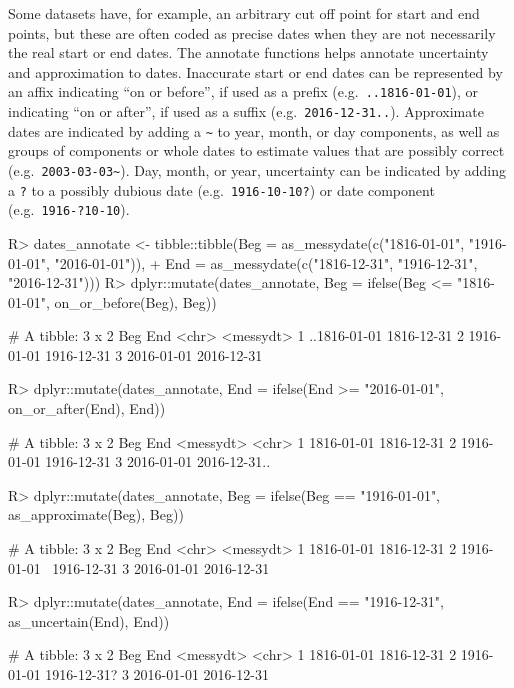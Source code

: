 \documentclass[
]{jss}
\begin{document}
Some datasets have, for example, an arbitrary cut off point for start
and end points, but these are often coded as precise dates when they are
not necessarily the real start or end dates. The annotate functions
helps annotate uncertainty and approximation to dates. Inaccurate start
or end dates can be represented by an affix indicating ``on or before'',
if used as a prefix (e.g.~\texttt{..1816-01-01}), or indicating ``on or
after'', if used as a suffix (e.g.~\texttt{2016-12-31..}). Approximate
dates are indicated by adding a \texttt{\textasciitilde{}} to year,
month, or day components, as well as groups of components or whole dates
to estimate values that are possibly correct
(e.g.~\texttt{2003-03-03\textasciitilde{}}). Day, month, or year,
uncertainty can be indicated by adding a \texttt{?} to a possibly
dubious date (e.g.~\texttt{1916-10-10?}) or date component
(e.g.~\texttt{1916-?10-10}).

\begin{CodeChunk}
\begin{CodeInput}
R> dates_annotate <- tibble::tibble(Beg = as_messydate(c("1816-01-01", "1916-01-01", "2016-01-01")),
+                                  End = as_messydate(c("1816-12-31", "1916-12-31", "2016-12-31")))
R> dplyr::mutate(dates_annotate, Beg = ifelse(Beg <= "1816-01-01", on_or_before(Beg), Beg))
\end{CodeInput}
\begin{CodeOutput}
# A tibble: 3 x 2
  Beg          End       
  <chr>        <messydt> 
1 ..1816-01-01 1816-12-31
2 1916-01-01   1916-12-31
3 2016-01-01   2016-12-31
\end{CodeOutput}
\begin{CodeInput}
R> dplyr::mutate(dates_annotate, End = ifelse(End >= "2016-01-01", on_or_after(End), End))
\end{CodeInput}
\begin{CodeOutput}
# A tibble: 3 x 2
  Beg        End         
  <messydt>  <chr>       
1 1816-01-01 1816-12-31  
2 1916-01-01 1916-12-31  
3 2016-01-01 2016-12-31..
\end{CodeOutput}
\begin{CodeInput}
R> dplyr::mutate(dates_annotate, Beg = ifelse(Beg == "1916-01-01", as_approximate(Beg), Beg))
\end{CodeInput}
\begin{CodeOutput}
# A tibble: 3 x 2
  Beg         End       
  <chr>       <messydt> 
1 1816-01-01  1816-12-31
2 1916-01-01~ 1916-12-31
3 2016-01-01  2016-12-31
\end{CodeOutput}
\begin{CodeInput}
R> dplyr::mutate(dates_annotate, End = ifelse(End == "1916-12-31", as_uncertain(End), End))
\end{CodeInput}
\begin{CodeOutput}
# A tibble: 3 x 2
  Beg        End        
  <messydt>  <chr>      
1 1816-01-01 1816-12-31 
2 1916-01-01 1916-12-31?
3 2016-01-01 2016-12-31 
\end{CodeOutput}
\end{CodeChunk}
\end{document}
